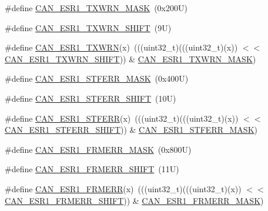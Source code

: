 \begin{DoxyCompactItemize}
\item 
\#define \mbox{\hyperlink{group___c_a_n___register___masks_ga62d716c6701375e3106853152e62a312}{C\+A\+N\+\_\+\+E\+S\+R1\+\_\+\+T\+X\+W\+R\+N\+\_\+\+M\+A\+SK}}~(0x200\+U)
\item 
\#define \mbox{\hyperlink{group___c_a_n___register___masks_ga62114b41b2b2c5fb95cedde48d06d361}{C\+A\+N\+\_\+\+E\+S\+R1\+\_\+\+T\+X\+W\+R\+N\+\_\+\+S\+H\+I\+FT}}~(9\+U)
\item 
\#define \mbox{\hyperlink{group___c_a_n___register___masks_ga6453b62a6be32eee717af1077a723306}{C\+A\+N\+\_\+\+E\+S\+R1\+\_\+\+T\+X\+W\+RN}}(x)~(((uint32\+\_\+t)(((uint32\+\_\+t)(x)) $<$$<$ \mbox{\hyperlink{group___c_a_n___register___masks_ga62114b41b2b2c5fb95cedde48d06d361}{C\+A\+N\+\_\+\+E\+S\+R1\+\_\+\+T\+X\+W\+R\+N\+\_\+\+S\+H\+I\+FT}})) \& \mbox{\hyperlink{group___c_a_n___register___masks_ga62d716c6701375e3106853152e62a312}{C\+A\+N\+\_\+\+E\+S\+R1\+\_\+\+T\+X\+W\+R\+N\+\_\+\+M\+A\+SK}})
\item 
\#define \mbox{\hyperlink{group___c_a_n___register___masks_ga8af394ab6bb4356bc5fa71e2278332ad}{C\+A\+N\+\_\+\+E\+S\+R1\+\_\+\+S\+T\+F\+E\+R\+R\+\_\+\+M\+A\+SK}}~(0x400\+U)
\item 
\#define \mbox{\hyperlink{group___c_a_n___register___masks_ga5f22b1b4cc45dbd63a5adb638b7c61a2}{C\+A\+N\+\_\+\+E\+S\+R1\+\_\+\+S\+T\+F\+E\+R\+R\+\_\+\+S\+H\+I\+FT}}~(10\+U)
\item 
\#define \mbox{\hyperlink{group___c_a_n___register___masks_ga1d6c6656b9644a35efcada8f20a356d9}{C\+A\+N\+\_\+\+E\+S\+R1\+\_\+\+S\+T\+F\+E\+RR}}(x)~(((uint32\+\_\+t)(((uint32\+\_\+t)(x)) $<$$<$ \mbox{\hyperlink{group___c_a_n___register___masks_ga5f22b1b4cc45dbd63a5adb638b7c61a2}{C\+A\+N\+\_\+\+E\+S\+R1\+\_\+\+S\+T\+F\+E\+R\+R\+\_\+\+S\+H\+I\+FT}})) \& \mbox{\hyperlink{group___c_a_n___register___masks_ga8af394ab6bb4356bc5fa71e2278332ad}{C\+A\+N\+\_\+\+E\+S\+R1\+\_\+\+S\+T\+F\+E\+R\+R\+\_\+\+M\+A\+SK}})
\item 
\#define \mbox{\hyperlink{group___c_a_n___register___masks_ga85fea1af50a657cc862d71d166949cbd}{C\+A\+N\+\_\+\+E\+S\+R1\+\_\+\+F\+R\+M\+E\+R\+R\+\_\+\+M\+A\+SK}}~(0x800\+U)
\item 
\#define \mbox{\hyperlink{group___c_a_n___register___masks_ga0efc518d9eecfd7ed1eaefac3fd8ec23}{C\+A\+N\+\_\+\+E\+S\+R1\+\_\+\+F\+R\+M\+E\+R\+R\+\_\+\+S\+H\+I\+FT}}~(11\+U)
\item 
\#define \mbox{\hyperlink{group___c_a_n___register___masks_ga7a967e12421889ffc0749fa6834898ce}{C\+A\+N\+\_\+\+E\+S\+R1\+\_\+\+F\+R\+M\+E\+RR}}(x)~(((uint32\+\_\+t)(((uint32\+\_\+t)(x)) $<$$<$ \mbox{\hyperlink{group___c_a_n___register___masks_ga0efc518d9eecfd7ed1eaefac3fd8ec23}{C\+A\+N\+\_\+\+E\+S\+R1\+\_\+\+F\+R\+M\+E\+R\+R\+\_\+\+S\+H\+I\+FT}})) \& \mbox{\hyperlink{group___c_a_n___register___masks_ga85fea1af50a657cc862d71d166949cbd}{C\+A\+N\+\_\+\+E\+S\+R1\+\_\+\+F\+R\+M\+E\+R\+R\+\_\+\+M\+A\+SK}})
$$
\end{DoxyCompactItemize}
